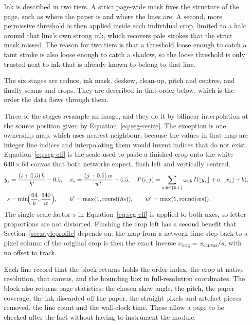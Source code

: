 Ink is described in two tiers. A strict page-wide mask fixes the structure of the page, such as where the paper is and where the lines are. A second, more permissive threshold is then applied inside each individual crop, limited to a halo around that line's own strong ink, which recovers pale strokes that the strict mask missed. The reason for two tiers is that a threshold loose enough to catch a faint stroke is also loose enough to catch a shadow, so the loose threshold is only trusted next to ink that is already known to belong to that line.

The six stages are reduce, ink mask, deskew, clean-up, pitch and centres, and finally seams and crops. They are described in that order below, which is the order the data flows through them.

Three of the stages resample an image, and they do it by bilinear interpolation at the source position given by Equation~\ref{eq:seg-resize}. The exception is one ownership map, which uses nearest neighbour, because the values in that map are integer line indices and interpolating them would invent indices that do not exist. Equation~\ref{eq:seg-clf} is the scale used to paste a finished crop onto the white $640\times64$ canvas that both networks expect, flush left and vertically centred.
\begin{align}
y_s&=\frac{(i+0.5)\,h}{h'}-0.5,\quad x_s=\frac{(j+0.5)\,w}{w'}-0.5,\quad I'(i,j)=\sum_{a,b\in\{0,1\}}\omega_{ab}\,I(\lfloor y_s\rfloor+a,\lfloor x_s\rfloor+b),\label{eq:seg-resize}\\
s&=\min\!\Bigl(\frac{64}{h},\frac{640}{w}\Bigr),\qquad h'=\max(1,\mathrm{round}(hs)),\qquad w'=\max(1,\mathrm{round}(ws)).\label{eq:seg-clf}
\end{align}
The single scale factor $s$ in Equation~\ref{eq:seg-clf} is applied to both axes, so letter proportions are not distorted. Flushing the crop left has a second benefit that Section~\ref{sec:styleprofile} depends on: the map from a network time step back to a pixel column of the original crop is then the exact inverse $x_{\mathrm{orig}}=x_{\mathrm{canvas}}/s$, with no offset to track.

Each line record that the block returns holds the order index, the crop at native resolution, that canvas, and the bounding box in full-resolution coordinates. The block also returns page statistics: the chosen skew angle, the pitch, the paper coverage, the ink discarded off the paper, the straight pixels and artefact pieces removed, the line count and the wall-clock time. These allow a page to be checked after the fact without having to instrument the module.


